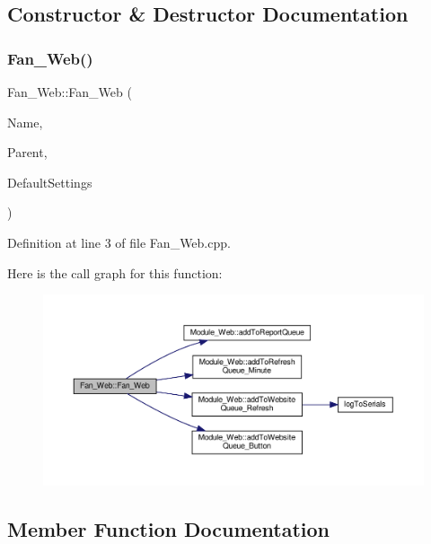 \subsection{Constructor \& Destructor Documentation}
\mbox{\label{class_fan___web_a54f9ab383ef943d6b7ffc770b2220024}} 
\subsubsection{\texorpdfstring{Fan\+\_\+\+Web()}{Fan\_Web()}}
{\footnotesize\ttfamily Fan\+\_\+\+Web\+::\+Fan\+\_\+\+Web (\begin{DoxyParamCaption}\item[{const \+\_\+\+\_\+\+Flash\+String\+Helper $\ast$}]{Name,  }\item[{\hyperlink{class_module___web}{Module\+\_\+\+Web} $\ast$}]{Parent,  }\item[{\hyperlink{struct_settings_1_1_fan_settings}{Settings\+::\+Fan\+Settings} $\ast$}]{Default\+Settings }\end{DoxyParamCaption})}



Definition at line 3 of file Fan\+\_\+\+Web.\+cpp.

Here is the call graph for this function\+:
\nopagebreak
\begin{figure}[H]
\begin{center}
\leavevmode
\includegraphics[width=350pt]{class_fan___web_a54f9ab383ef943d6b7ffc770b2220024_cgraph}
\end{center}
\end{figure}


\subsection{Member Function Documentation}
\mbox{\label{class_fan___web_a2741ea624a781febbd4f3e2bf82c89ed}} 
